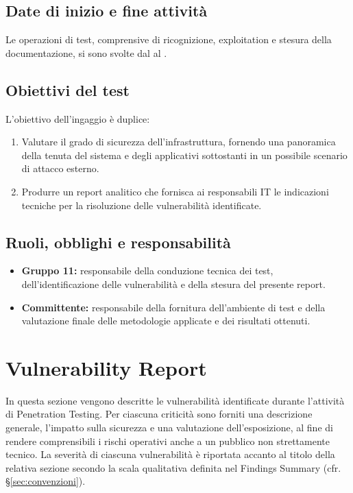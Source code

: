 \documentclass[11pt]{report}
\begin{document}
	\section{Date di inizio e fine attività}
	Le operazioni di test, comprensive di ricognizione, exploitation e stesura della documentazione, si sono svolte dal  al .
	
	\section{Obiettivi del test}
	L'obiettivo dell'ingaggio è duplice: 
	\begin{enumerate}
		\item Valutare il grado di sicurezza dell'infrastruttura, fornendo una panoramica della tenuta del sistema e degli applicativi sottostanti in un possibile scenario di attacco esterno.
		\item Produrre un report analitico che fornisca ai responsabili IT le indicazioni tecniche per la risoluzione delle vulnerabilità identificate.
	\end{enumerate}
	
	\section{Ruoli, obblighi e responsabilità}
	\begin{itemize}
		\item \textbf{Gruppo 11:} responsabile della conduzione tecnica dei test, dell'identificazione delle vulnerabilità e della stesura del presente report.
		\item \textbf{Committente:} responsabile della fornitura dell'ambiente di test e della valutazione finale delle metodologie applicate e dei risultati ottenuti.
	\end{itemize}
	
	\chapter{Vulnerability Report}
	In questa sezione vengono descritte le vulnerabilità identificate durante l'attività di Penetration Testing. Per ciascuna criticità sono forniti una descrizione generale, l'impatto sulla sicurezza e una valutazione dell'esposizione, al fine di rendere comprensibili i rischi operativi anche a un pubblico non strettamente tecnico. La severità di ciascuna vulnerabilità è riportata accanto al titolo della relativa sezione secondo la scala qualitativa definita nel Findings Summary (cfr. \S\ref{sec:convenzioni}).
	
\end{document}
